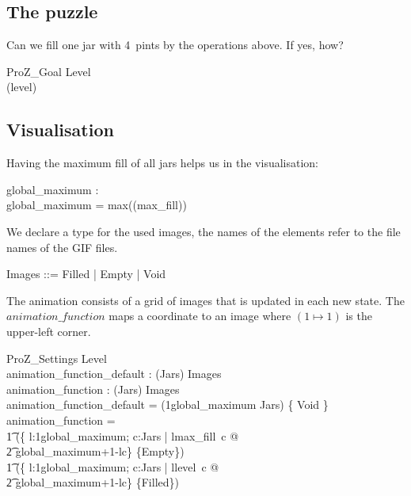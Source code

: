 \documentclass{article}
\begin{document}
\subsection*{The puzzle}
Can we fill one jar with 4~pints by the operations above. If yes, how?
\begin{schema}{ProZ\_Goal}
  Level \\
   \in \ran(level)
\end{schema}

\subsection*{Visualisation}
Having the maximum fill of all jars helps us in the visualisation:
\begin{axdef}
  global\_maximum : \nat \\
  \where
  global\_maximum = max(\ran(max\_fill)) \\
\end{axdef}

We declare a type for the used images, the names of the elements refer to the file names of the GIF files.
\begin{zed}
  Images ::= Filled | Empty | Void
\end{zed}
The animation consists of a grid of images that is updated in each new state.
The $animation\_function$ maps a coordinate to an image where $(1\mapsto 1)$ is the upper-left corner.
\begin{schema}{ProZ\_Settings}
  Level \\
  animation\_function\_default : (\nat \cross Jars) \pfun Images \\
  animation\_function : (\nat \cross Jars) \pfun Images \\
  \where
  animation\_function\_default = (1\upto global\_maximum \cross Jars) \cross \{ Void \} \\
  animation\_function = \\
  \t1 (\{ l:1\upto global\_maximum; c:Jars | l\leq max\_fill~c @ \\
  \t2 global\_maximum+1-l\mapsto c\} \cross \{Empty\}) \oplus \\
  \t1 (\{ l:1\upto global\_maximum; c:Jars | l\leq level~c @ \\
  \t2 global\_maximum+1-l\mapsto c\} \cross \{Filled\})
\end{schema}
\end{document}
